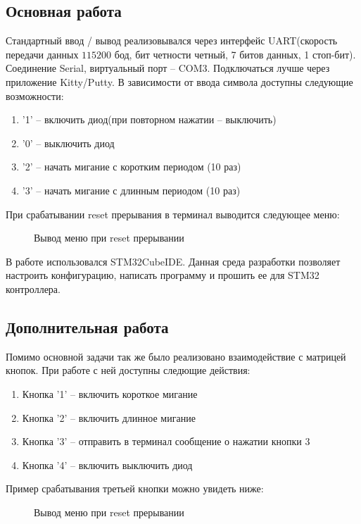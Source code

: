 \subsection{Основная работа}
Стандартный ввод / вывод реализовывался через интерфейс UART(скорость передачи данных $115200$ бод, бит четности четный,
7 битов данных, 1 стоп-бит). Соединение Serial, виртуальный порт -- COM3. Подключаться лучше через приложение Kitty/Putty.
В зависимости от ввода символа доступны следующие возможности:
\begin{enumerate}
\item '1' -- включить диод(при повторном нажатии -- выключить)
\item '0' -- выключить диод
\item '2' -- начать мигание с коротким периодом (10 раз)
\item '3' -- начать мигание с длинным периодом (10 раз)
\end{enumerate}

При срабатывании reset прерывания в терминал выводится следующее меню:
\begin{figure}[H]
    \centering
        \caption{Вывод меню при reset прерывании}
\end{figure}

В работе использовался STM32CubeIDE. Данная среда разработки позволяет настроить конфигурацию, написать программу и 
прошить ее для STM32 контроллера.

\subsection{Дополнительная работа}
Помимо основной задачи так же было реализовано взаимодействие с матрицей кнопок. При работе с ней доступны следющие действия:
\begin{enumerate}
    \item Кнопка '1' -- включить короткое мигание
    \item Кнопка '2' -- включить длинное мигание
    \item Кнопка '3' -- отправить в терминал сообщение о нажатии кнопки 3
    \item Кнопка '4' -- включить выключить диод
\end{enumerate}
Пример срабатывания третьей кнопки можно увидеть ниже:
\begin{figure}[H]
    \centering
        \caption{Вывод меню при reset прерывании}
\end{figure}


